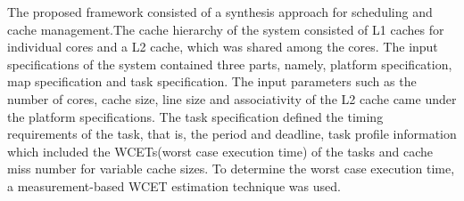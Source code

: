 \documentclass[conference]{IEEEtran}
\begin{document}
    The proposed framework consisted of a synthesis approach for scheduling and cache management.The cache hierarchy of the system consisted of L1 caches for individual cores and a L2 cache, which was shared among the cores. The input specifications of the system contained three parts, namely, platform specification, map specification and task specification. The input parameters such as the number of cores, cache size, line size and associativity of the L2 cache came under the platform specifications. The task specification defined the timing requirements of the task, that is, the period and deadline, task profile information which included the WCETs(worst case execution time) of the tasks and cache miss number for variable cache sizes. To determine the worst case execution time, a measurement-based WCET estimation technique was used.
    
\end{document}
